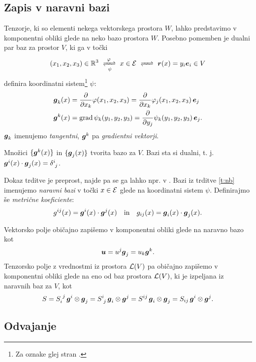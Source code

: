 \subsection{Zapis v naravni bazi}

Tenzorje, ki so elementi nekega vektorskega prostora $W$, lahko predstavimo v komponentni obliki
glede na neko bazo prostora $W$. Posebno pomemben je dualni par baz za prostor $V$, ki ga v točki
\[
	(x_1,x_2,x_3)\in \R^3\ \xrightleftharpoons[\ \psi\ ]{\ \varphi\ }\ 
	x\in\E\ \xrightleftharpoons[\ \phantom{\varphi}\ ]{\ \phantom{\psi}\ }\ 
	\vek{r}(x)=y_i\vek{e}_i \in V
\]
definira koordinatni sistem\footnote{Za oznake glej stran \pageref{d:ks}.} $\psi$:
\begin{align*}
	\boldsymbol g_k(x)&=\frac{\partial}{\partial x_k}\varphi(x_1,x_2,x_3)=
	\frac{\partial}{\partial x_k}\varphi_j(x_1,x_2,x_3)\,\boldsymbol e_j \\
	\boldsymbol g^k(x)&=\mathrm{grad}\, \psi_k(y_1,y_2,y_3)=
	\frac{\partial}{\partial y_j}\psi_k(y_1,y_2,y_3)\,\boldsymbol e_j.
\end{align*}
$\boldsymbol g_k$ imenujemo \emph{tangentni}, $\boldsymbol g^k$ pa \emph{gradientni vektorji}.
\begin{trditev}\label{t:nb}
	Množici $\{\boldsymbol g^k(x)\}$ in $\{\boldsymbol g_j(x)\}$ tvorita bazo za $V$.
	Bazi sta si dualni, t. j. $\vek{g}^i(x)\cdot\vek{g}_j(x)=\topbot{\delta}{i}{j}$.
\end{trditev}
Dokaz trditve je preprost, najde pa se ga lahko npr. v \cite[str.~273]{liu}. Bazi iz trditve \ref{t:nb}
imenujemo \emph{naravni bazi} v točki $x\in\mathcal E$ glede na koordinatni sistem $\psi$.
Definirajmo še \emph{metrične koeficiente}:
\begin{equation*}
	g^{ij}(x)=\boldsymbol g^i(x)\cdot\boldsymbol g^j(x) \quad\mathrm{in}\quad g_{ij}(x)=\boldsymbol g_i(x)\cdot\boldsymbol g_j(x).
\end{equation*}

Vektorsko polje običajno zapišemo v komponentni obliki glede na naravno bazo kot
\[ \boldsymbol u=u^j\boldsymbol g_j=u_k\boldsymbol g^k. \]
Tenzorsko polje z vrednostmi iz prostora $\mathcal L(V)$ pa običajno zapišemo v komponentni obliki
glede na eno od baz prostora $\mathcal L(V)$, ki je izpeljana iz naravnih baz za $V$, kot
\[
	S=\bottop{S}{i}{j}\,\vek{g}^i\otimes\vek{g}_j=\topbot{S}{i}{j}\,\vek{g}_i\otimes\vek{g}^j=
	S^{ij}\,\vek{g}_i\otimes\vek{g}_j=S_{ij}\,\vek{g}^i\otimes\vek{g}^j.
\]

\subsection{Odvajanje}

